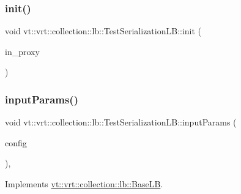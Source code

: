 \subsubsection{\texorpdfstring{init()}{init()}}
{\footnotesize\ttfamily void vt\+::vrt\+::collection\+::lb\+::\+Test\+Serialization\+L\+B\+::init (\begin{DoxyParamCaption}\item[{\hyperlink{structvt_1_1objgroup_1_1proxy_1_1_proxy}{objgroup\+::proxy\+::\+Proxy}$<$ \hyperlink{structvt_1_1vrt_1_1collection_1_1lb_1_1_test_serialization_l_b}{Test\+Serialization\+LB} $>$}]{in\+\_\+proxy }\end{DoxyParamCaption})}

\mbox{\label{structvt_1_1vrt_1_1collection_1_1lb_1_1_test_serialization_l_b_a6d1150f9af14ef8ab51235eaed94c6bf}} 
\subsubsection{\texorpdfstring{input\+Params()}{inputParams()}}
{\footnotesize\ttfamily void vt\+::vrt\+::collection\+::lb\+::\+Test\+Serialization\+L\+B\+::input\+Params (\begin{DoxyParamCaption}\item[{\hyperlink{structvt_1_1vrt_1_1collection_1_1balance_1_1_config_entry}{balance\+::\+Config\+Entry} $\ast$}]{config }\end{DoxyParamCaption})\hspace{0.3cm}{\ttfamily [override]}, {\ttfamily [virtual]}}



Implements \hyperlink{structvt_1_1vrt_1_1collection_1_1lb_1_1_base_l_b_acf56a0cc29f5e00c0dccf2003baa2f43}{vt\+::vrt\+::collection\+::lb\+::\+Base\+LB}.

\mbox{\label{structvt_1_1vrt_1_1collection_1_1lb_1_1_test_serialization_l_b_afb9f6848d8ea2432e2121a32aee56d54}} 
